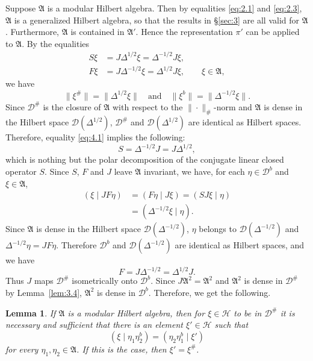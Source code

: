 \documentclass[12pt,b5paper,twoside]{article}
\theoremstyle{takesaki}
\newtheorem{lemma}{Lemma}[section]
\numberwithin{equation}{section}
\begin{document}
Suppose $\mathfrak A$ is a modular Hilbert algebra.  Then by equalities
\eqref{eq:2.1} and \eqref{eq:2.3}, $\mathfrak A$ is a generalized
Hilbert algebra, so that the results in \S\ref{sec:3} are all valid for
$\mathfrak A$.  Furthermore, $\mathfrak A$ is contained in
$\mathfrak A'$.  Hence the representation $\pi'$ can be applied to
$\mathfrak A$.  By the equalities
\begin{align}
 S\xi&=J\Delta^{1/2}\xi=\Delta^{-1/2}J\xi,
 \tag{4.1}\label{eq:4.1}\\
 F\xi&=J\Delta^{-1/2}\xi=\Delta^{1/2}J\xi,
 \qquad \xi\in\mathfrak A,
 \tag{4.2}\label{eq:4.2}
\end{align}
we have
\[
 \|\xi^\#\|=\|\Delta^{1/2}\xi\|
 \quad\text{and}\quad
 \|\xi^b\|=\|\Delta^{-1/2}\xi\|.
\]
Since $\mathcal D^\#$ is the closure of $\mathfrak A$ with respect to
the $\|\cdot\|_\#$-norm and $\mathfrak A$ is dense in the Hilbert space
$\mathcal D(\Delta^{1/2})$, $\mathcal D^\#$ and
$\mathcal D(\Delta^{1/2})$ are identical as Hilbert spaces.  Therefore,
equality \eqref{eq:4.1} implies the following:
\begin{equation}
 S=\Delta^{-1/2}J=J\Delta^{1/2},
 \tag{4.3}\label{eq:4.3}
\end{equation}
which is nothing but the polar decomposition of the conjugate linear
closed operator $S$.  Since $S$, $F$ and $J$ leave $\mathfrak A$
invariant, we have, for each $\eta\in\mathcal D^b$ and
$\xi\in\mathfrak A$,
\begin{align*}
 (\xi\mid JF\eta)
   &=(F\eta\mid J\xi)=(SJ\xi\mid\eta)\\
   &=(\Delta^{-1/2}\xi\mid\eta).
\end{align*}
Since $\mathfrak A$ is dense in the Hilbert space
$\mathcal D(\Delta^{-1/2})$, $\eta$ belongs to
$\mathcal D(\Delta^{-1/2})$ and $\Delta^{-1/2}\eta=JF\eta$.
Therefore $\mathcal D^b$ and $\mathcal D(\Delta^{-1/2})$ are identical
as Hilbert spaces, and we have
\begin{equation}
 F=J\Delta^{-1/2}=\Delta^{1/2}J.
 \tag{4.4}\label{eq:4.4}
\end{equation}
Thus $J$ maps $\mathcal D^\#$ isometrically onto $\mathcal D^b$.
Since $J\mathfrak A^2=\mathfrak A^2$ and $\mathfrak A^2$ is dense in
$\mathcal D^\#$ by Lemma~\ref{lem:3.4}, $\mathfrak A^2$ is dense in
$\mathcal D^b$.  Therefore, we get the following.

\begin{lemma}\label{lem:4.1}
If $\mathfrak A$ is a modular Hilbert algebra, then for
$\xi\in\mathcal H$ to be in $\mathcal D^\#$ it is necessary and
sufficient that there is an element $\xi'\in\mathcal H$ such that
\[
 (\xi\mid\eta_1\eta_2^b)=(\eta_2\eta_1^b\mid\xi')
\]
for every $\eta_1,\eta_2\in\mathfrak A$.  If this is the case, then
$\xi'=\xi^\#$.
\end{lemma}
\end{document}
